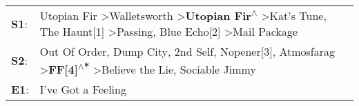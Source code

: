 \begin{supertabular}{p{0.03\textwidth}p{0.92\textwidth}}
 \textbf{S1}:  &  Utopian Fir\textsuperscript{} \textgreater \enspace Walletsworth\textsuperscript{} \textgreater \enspace \textbf{Utopian Fir\textsuperscript{$\wedge$}} \textgreater \enspace Kat's Tune\textsuperscript{}, \enspace The Haunt[1]\textsuperscript{} \textgreater \enspace Passing\textsuperscript{}, \enspace Blue Echo[2]\textsuperscript{} \textgreater \enspace Mail Package\textsuperscript{}  \enspace  \\
 \textbf{S2}:  &                                         Out Of Order\textsuperscript{}, \enspace Dump City\textsuperscript{}, \enspace 2nd Self\textsuperscript{}, \enspace Nopener[3]\textsuperscript{}, \enspace Atmosfarag\textsuperscript{} \textgreater \enspace \textbf{FF[4]\textsuperscript{$\wedge$*}} \textgreater \enspace Believe the Lie\textsuperscript{}, \enspace Sociable Jimmy\textsuperscript{}  \enspace  \\
 \textbf{E1}:  &                                                                                                                                                                                                                                                                                                                                                               I've Got a Feeling\textsuperscript{}  \enspace  \\
\end{supertabular}

